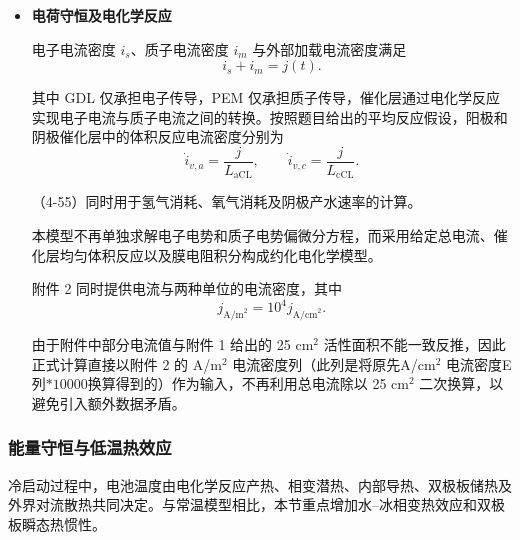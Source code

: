 \documentclass[bwprint]{gmcmthesis}
\numberwithin{figure}{section}
\begin{document}
\begin{itemize}
阳极催化层中氢气消耗源项为
\begin{equation}
S_{\text{H}_2} = -\frac{j}{2F L_{\text{aCL}}}, \qquad x \in \Omega_{\text{aCL}}, \tag{4-52}
\end{equation}

阴极催化层氧气消耗源项为
\begin{equation}
S_{\text{O}_2} = -\frac{j}{4F L_{\text{cCL}}}, \qquad x \in \Omega_{\text{cCL}}. \tag{4-53}
\end{equation}

其他区域相应源项均取零。

由（4-44）--（4-50）可知，冰累积首先降低 \(\varepsilon_g\)，继而降低 \(D_{\text{O}_2,\text{eff}}\)，最终使阴极 CL 中氧气浓度下降。这一传质链条构成冰堵引起浓差极化增强的重要物理机制。

\item \textbf {电荷守恒及电化学反应}

电子电流密度 \(i_s\)、质子电流密度 \(i_m\) 与外部加载电流密度满足
\begin{equation}
i_s + i_m = j(t). \tag{4-54}
\end{equation}

其中 GDL 仅承担电子传导，PEM 仅承担质子传导，催化层通过电化学反应实现电子电流与质子电流之间的转换。按照题目给出的平均反应假设，阳极和阴极催化层中的体积反应电流密度分别为
\begin{equation}
\dot{i}_{v,a} = \frac{j}{L_{\text{aCL}}}, \qquad \dot{i}_{v,c} = \frac{j}{L_{\text{cCL}}}. \tag{4-55}
\end{equation}

（4-55）同时用于氢气消耗、氧气消耗及阴极产水速率的计算。

本模型不再单独求解电子电势和质子电势偏微分方程，而采用给定总电流、催化层均匀体积反应以及膜电阻积分构成约化电化学模型。

附件 2 同时提供电流与两种单位的电流密度，其中
\[
j_{\text{A/m}^2} = 10^4 j_{\text{A/cm}^2}.
\]

由于附件中部分电流值与附件 1 给出的 25 cm\(^2\) 活性面积不能一致反推，因此正式计算直接以附件 2 的 A/m\(^2\) 电流密度列（此列是将原先A/cm\(^2\) 电流密度E列$*10000$换算得到的）作为输入，不再利用总电流除以 25 cm\(^2\) 二次换算，以避免引入额外数据矛盾。

\end{itemize}


\subsubsection{能量守恒与低温热效应}
冷启动过程中，电池温度由电化学反应产热、相变潜热、内部导热、双极板储热及外界对流散热共同决定。与常温模型相比，本节重点增加水–冰相变热效应和双极板瞬态热惯性。
\end{document}
